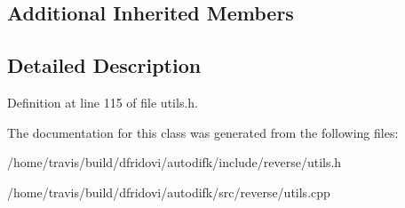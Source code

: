 \subsection*{Additional Inherited Members}


\subsection{Detailed Description}


Definition at line 115 of file utils.\-h.



The documentation for this class was generated from the following files\-:\begin{DoxyCompactItemize}
\item 
/home/travis/build/dfridovi/autodifk/include/reverse/utils.\-h\item 
/home/travis/build/dfridovi/autodifk/src/reverse/utils.\-cpp\end{DoxyCompactItemize}
